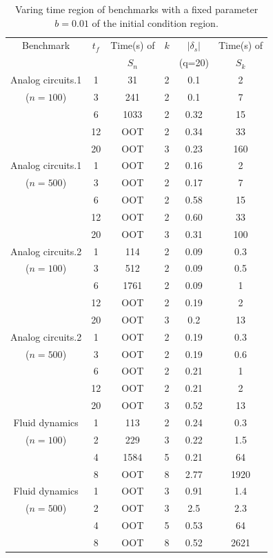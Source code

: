 \documentclass[runningheads,a4paper]{llncs}
\theoremstyle{definition}
\theoremstyle{plain}
\begin{document}
 \begin{table}[htbp]\footnotesize
  \centering
  \caption{Varing time region of benchmarks with a fixed parameter $b=0.01$ of the initial condition region.}
  \label{tab:time_region}
  \begin{tabular}{cccccc}
    \toprule
    Benchmark& $t_f$ &Time(s) of& $k$ & $|\delta_s| $ & Time(s) of\\
         && $S_n$&&(q=20)& $S_k$\\\hline
    \midrule
    Analog circuits.1 & 1 & 31 & 2 &0.1& 2\\
    ($n=100$)&3 & 241& 2 & 0.1 &7\\
    &6 & 1033& 2 & 0.32 &15\\
    &12 & OOT& 2 & 0.34 &33\\
    &20 & OOT& 3 & 0.23 &160\\\hline
    Analog circuits.1 & 1 & OOT & 2 &0.16& 2\\
    ($n=500$)&3 & OOT& 2 & 0.17 &7\\
    &6 & OOT& 2 & 0.58 &15\\
    &12 &OOT& 2 & 0.60 &33\\
    &20 & OOT& 3 & 0.31 &100\\\hline
    Analog circuits.2 & 1 & 114 & 2 &0.09& 0.3\\
    ($n=100$)&3 &512 & 2 & 0.09 &0.5\\
    &6 & 1761& 2 & 0.09 &1\\
    &12 & OOT& 2 & 0.19 &2\\
    &20 & OOT& 3 & 0.2 &13\\\hline
    Analog circuits.2 & 1 & OOT & 2 &0.19& 0.3\\
    ($n=500$)&3 & OOT& 2 & 0.19 &0.6\\
    &6 & OOT& 2 & 0.21 &1\\
    &12 &OOT& 2 & 0.21 &2\\
    &20 & OOT& 3 & 0.52 &13\\\hline
    Fluid dynamics & 1 & 113 & 2 &0.24& 0.3\\
    ($n=100$)&2 & 229& 3 & 0.22 &1.5\\
    &4 & 1584& 5 & 0.21 &64\\
    &8 & OOT& 8 & 2.77 &1920\\\hline
    Fluid dynamics & 1 & OOT & 3 &0.91 & 1.4\\
    ($n=500$)&2 & OOT& 3 & 2.5 &2.3\\
    &4 & OOT& 5 & 0.53 &64\\
    &8 & OOT& 8 & 0.52 &2621\\\hline
    \bottomrule
  \end{tabular}
\end{table}
\end{document}
